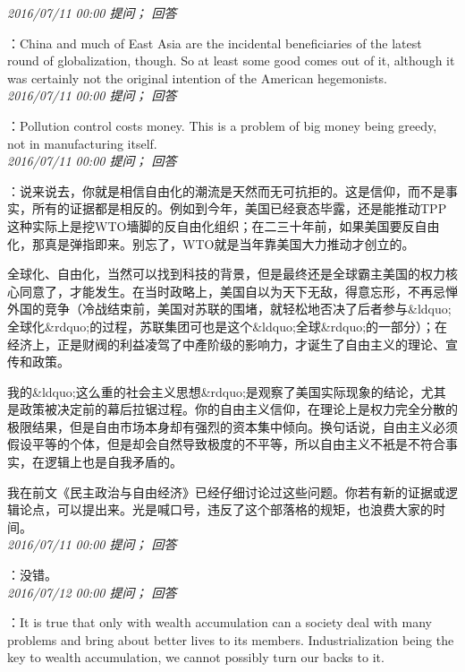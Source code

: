 \documentclass[twocolumn]{ctexart}
\begin{document}
\textit{\hfill\noindent\small 2016/07/11 00:00 提问； 回答}

：China and much of East Asia are the incidental beneficiaries of the latest round of globalization, though. So at least some good comes out of it, although it was certainly not the original intention of the American hegemonists.\\

\textit{\hfill\noindent\small 2016/07/11 00:00 提问； 回答}

：Pollution control costs money. This is a problem of big money being greedy, not in manufacturing itself.\\

\textit{\hfill\noindent\small 2016/07/11 00:00 提问； 回答}

：说来说去，你就是相信自由化的潮流是天然而无可抗拒的。这是信仰，而不是事实，所有的证据都是相反的。例如到今年，美国已经衰态毕露，还是能推动TPP这种实际上是挖WTO墻脚的反自由化组织；在二三十年前，如果美国要反自由化，那真是弹指即来。别忘了，WTO就是当年靠美国大力推动才创立的。

全球化、自由化，当然可以找到科技的背景，但是最终还是全球霸主美国的权力核心同意了，才能发生。在当时政略上，美国自以为天下无敌，得意忘形，不再忌惮外国的竞争（冷战结束前，美国对苏联的围堵，就轻松地否决了后者参与\&ldquo;全球化\&rdquo;的过程，苏联集团可也是这个\&ldquo;全球\&rdquo;的一部分）；在经济上，正是财阀的利益凌驾了中產阶级的影响力，才诞生了自由主义的理论、宣传和政策。

我的\&ldquo;这么重的社会主义思想\&rdquo;是观察了美国实际现象的结论，尤其是政策被决定前的幕后拉锯过程。你的自由主义信仰，在理论上是权力完全分散的极限结果，但是自由市场本身却有强烈的资本集中倾向。换句话说，自由主义必须假设平等的个体，但是却会自然导致极度的不平等，所以自由主义不衹是不符合事实，在逻辑上也是自我矛盾的。

我在前文《民主政治与自由经济》已经仔细讨论过这些问题。你若有新的证据或逻辑论点，可以提出来。光是喊口号，违反了这个部落格的规矩，也浪费大家的时间。\\

\textit{\hfill\noindent\small 2016/07/11 00:00 提问； 回答}

：没错。\\

\textit{\hfill\noindent\small 2016/07/12 00:00 提问； 回答}

：It is true that only with wealth accumulation can a society deal with many problems and bring about better lives to its members. Industrialization being the key to wealth accumulation, we cannot possibly turn our backs to it.
\end{document}
